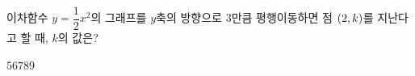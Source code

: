 이차함수 $y=\dfrac{1}{2}x^2$의 그래프를 $y$축의 방향으로 $3$만큼 평행이동하면 점 $(2{,}\mkern3mu k)$를 지난다고 할 때, $k$의 값은?
\begin{choices32}{$5$}{$6$}{$7$}{$8$}{$9$}\end{choices32}
